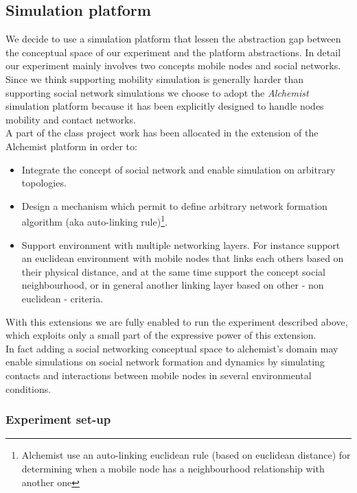 \subsection{Simulation platform}
\label{exp_platform}

We decide to use a simulation platform that lessen the abstraction gap between the conceptual space of our experiment and the platform abstractions. In detail our experiment mainly involves two concepts mobile nodes and social networks. Since we think supporting mobility simulation is generally harder than supporting social network simulations we choose to adopt the \emph{Alchemist} simulation platform\cite{pianini-jos2013} because it has been explicitly designed to handle nodes mobility and contact networks.\\
A part of the class project work has been allocated in the extension of the Alchemist platform in order to: 
\begin{itemize}
\item Integrate the concept of social network and enable simulation on arbitrary topologies.
\item Design a mechanism which permit to define arbitrary network formation algorithm (aka auto-linking rule)\footnote{Alchemist use an auto-linking euclidean rule (based on euclidean distance) for determining when a mobile node has a neighbourhood relationship with another one}.
\item Support environment with multiple networking layers. For instance support an euclidean environment with mobile nodes that links each others based on their physical distance, and at the same time support the concept social neighbourhood, or in general another linking layer based on other - non euclidean - criteria.
\end{itemize}

With this extensions we are fully enabled to run the experiment described above, which exploits only a small part of the expressive power of this extension.\\
In fact adding a social networking conceptual space to alchemist's domain may enable simulations on social network formation and dynamics by simulating contacts and interactions between mobile nodes in several environmental conditions.\\


\subsubsection{Experiment set-up}
\label{exp_setup}

